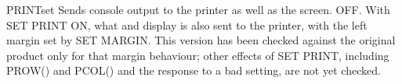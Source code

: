 \begin{XbaseEntry}{PRINT}{set}
Sends console output to the printer as well as the screen.
\Syntax
{}
\Defaults
OFF.
\Usage
With SET PRINT ON, what  and  display is also sent to the
printer, with the left margin set by SET MARGIN.  This version has been checked
against the original product only for that margin behaviour; other effects of
SET PRINT, including PROW() and PCOL() and the response to a bad setting, are
not yet checked.
\end{XbaseEntry}
